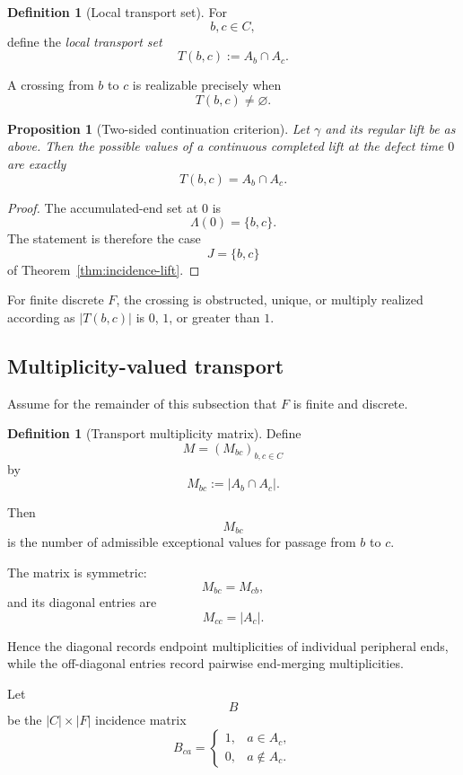 \documentclass[11pt]{article}
\theoremstyle{plain}
\newtheorem{proposition}[theorem]{Proposition}
\theoremstyle{definition}
\newtheorem{definition}[theorem]{Definition}
\begin{document}
\begin{definition}[Local transport set]
\label{def:local-transport-set}
For
\[
b,c\in C,
\]
define the \emph{local transport set}
\[
T(b,c)
:=
A_b\cap A_c.
\]
\end{definition}

A crossing from $b$ to $c$ is realizable precisely when
\[
T(b,c)\neq\varnothing.
\]

\begin{proposition}[Two-sided continuation criterion]
\label{prop:two-sided-continuation}
Let $\gamma$ and its regular lift be as above.  Then the possible values
of a continuous completed lift at the defect time $0$ are exactly
\[
T(b,c)=A_b\cap A_c.
\]
\end{proposition}

\begin{proof}
The accumulated-end set at $0$ is
\[
\Lambda(0)=\{b,c\}.
\]
The statement is therefore the case
\[
J=\{b,c\}
\]
of Theorem~\ref{thm:incidence-lift}.
\end{proof}

For finite discrete $F$, the crossing is obstructed, unique, or multiply realized according as $|T(b,c)|$ is $0$, $1$, or greater than $1$.

\subsection{Multiplicity-valued transport}
\label{subsec:multiplicity-transport}

Assume for the remainder of this subsection that $F$ is finite and
discrete.

\begin{definition}[Transport multiplicity matrix]
\label{def:transport-matrix}
Define
\[
M=(M_{bc})_{b,c\in C}
\]
by
\[
M_{bc}
:=
|A_b\cap A_c|.
\]
\end{definition}

Then
\[
M_{bc}
\]
is the number of admissible exceptional values for passage from $b$ to $c$.

The matrix is symmetric:
\[
M_{bc}=M_{cb},
\]
and its diagonal entries are
\[
M_{cc}=|A_c|.
\]

Hence the diagonal records endpoint multiplicities of individual
peripheral ends, while the off-diagonal entries record pairwise
end-merging multiplicities.

Let
\[
B
\]
be the $|C|\times |F|$ incidence matrix
\[
B_{ca}
=
\begin{cases}
1,&a\in A_c,\\
0,&a\notin A_c.
\end{cases}
\]
\end{document}
